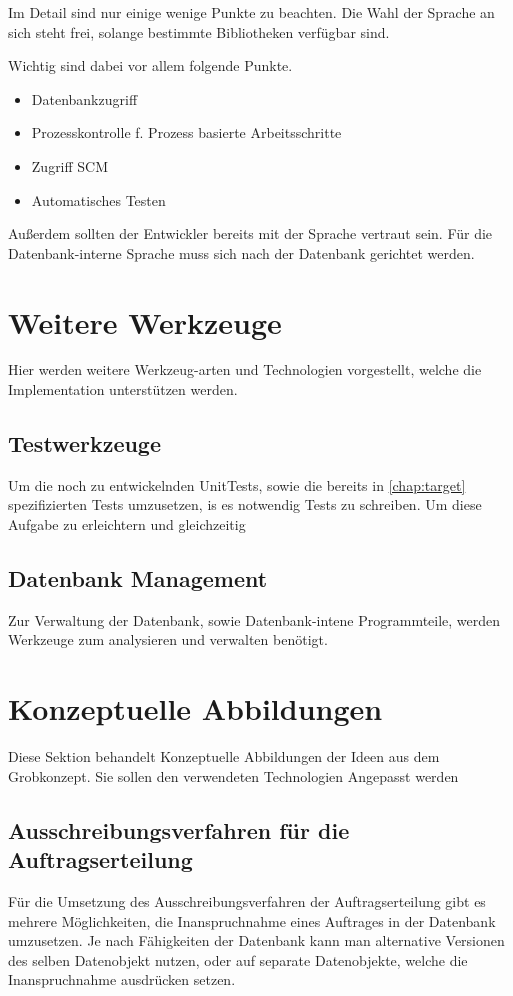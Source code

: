 Im Detail sind nur einige wenige Punkte zu beachten.
Die Wahl der Sprache an sich steht frei,
solange bestimmte Bibliotheken verf\"ugbar sind.

Wichtig sind dabei vor allem folgende Punkte.
\begin{itemize}
    \item Datenbankzugriff 
    \item Prozesskontrolle f. Prozess basierte Arbeitsschritte
    \item Zugriff SCM
    \item Automatisches Testen
\end{itemize}

Außerdem sollten der Entwickler bereits mit der Sprache vertraut sein.
Für die Datenbank-interne Sprache muss sich nach der Datenbank gerichtet werden.


\section{Weitere Werkzeuge}

Hier werden weitere Werkzeug-arten und Technologien vorgestellt,
welche die Implementation unterstützen werden.

\subsection{Testwerkzeuge}

Um die noch zu entwickelnden UnitTests,
sowie die bereits in \cref{chap:target} spezifizierten Tests umzusetzen,
is es notwendig Tests zu schreiben. Um diese Aufgabe zu erleichtern
und gleichzeitig 

\subsection{Datenbank Management}

Zur Verwaltung der Datenbank, sowie Datenbank-intene Programmteile,
werden Werkzeuge zum analysieren und verwalten benötigt.


\section{Konzeptuelle Abbildungen}

Diese Sektion behandelt Konzeptuelle Abbildungen der Ideen aus dem Grobkonzept.
Sie sollen den verwendeten Technologien Angepasst werden

\subsection{Ausschreibungsverfahren für die Auftragserteilung}
\label{sec:verfahren:erteilung}
Für die Umsetzung des Ausschreibungsverfahren der Auftragserteilung gibt es
mehrere Möglichkeiten, die Inanspruchnahme eines Auftrages in
der Datenbank umzusetzen. Je nach Fähigkeiten der Datenbank kann man 
alternative Versionen des selben Datenobjekt nutzen,
oder auf separate Datenobjekte, welche die Inanspruchnahme ausdrücken setzen.

